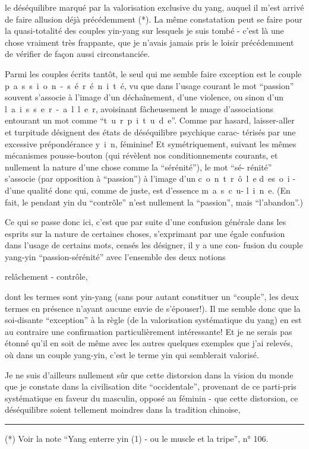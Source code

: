 le déséquilibre marqué par la valorisation exclusive du yang, auquel il m'est
arrivé de faire allusion déjà précédemment (*). La même constatation peut se
faire pour la quasi-totalité des couples yin-yang sur lesquels je suis tombé -
c'est là une chose vraiment très frappante, que je n'avais jamais pris le loisir
précédemment de vérifier de façon aussi circonstanciée.

Parmi les couples écrits tantôt, le seul qui me semble faire exception
est le couple \mbox{p a s s i o n - s é r é n i t é}, vu que dans l'usage courant\inserted{,}
le mot ``passion'' souvent s'associe à l'image d'un déchaînement, d'une violence,
ou sinon d'un \mbox{l a i s s e r - a l l e r}, avoisinant fâcheusement le nuage
d'associations entourant un mot comme ``\mbox{t u r p i t u d e}''. Comme par hasard,
laisser-aller et turpitude désignent des états de déséquilibre psychique carac-
térisés par une excessive prépondérance \mbox{y i n}, féminine! Et symétriquement,
suivant les mêmes mécanismes pousse-bouton (qui révèlent nos conditionnements
courants, et nullement la nature d'une chose comme la ``sérénité''), le mot ``sé-
rénité'' s'associe (par opposition à ``passion'') à l'image d'un \mbox{c o n t r ô l e}
\mbox{d e\quad s o i} - d'une qualité donc qui, comme de juste, est d'essence \mbox{m a s c u-}
\mbox{l i n e}. (En fait, le pendant yin du ``contrôle'' n'est nullement la ``passion'',
mais ``l'abandon''.)

Ce qui se passe donc ici, c'est que par suite d'une confusion générale
dans les esprits sur la nature de certaines choses, s'exprimant par une égale
confusion dans l'usage de certains mots, censés les désigner, il y a une con-
fusion du couple yang-yin ``passion-sérénité'' avec l'ensemble des deux notions
\begin{center}relâchement - contrôle,\end{center}
dont les termes sont yin-yang (sans pour autant constituer un ``couple'', les
deux termes en présence n'ayant aucune envie de s'épouser!). Il me semble donc
que la soi-disante ``exception'' à la règle (de la valorisation systématique du
yang) en est au contraire une confirmation particulièrement intéressante! Et
je ne serais pas étonné qu'il en soit de même avec les autres quelques exemples
que j'ai relevés, où dans un couple yang-yin, c'est le terme yin qui semblerait
valorisé.

Je ne suis d'ailleurs nullement sûr que cette distorsion dans la vision
du monde que je constate dans la civilisation dite ``occidentale'', provenant de ce
parti-pris systématique en faveur du masculin, opposé au féminin - que cette
distorsion, ce déséquilibre soient tellement moindres dans la tradition chinoise,
\par\noindent\rule{0.24\linewidth}{0.3pt}\par
(*) Voir la note ``Yang enterre yin (1) - ou le muscle et la tripe'', n° 106.

